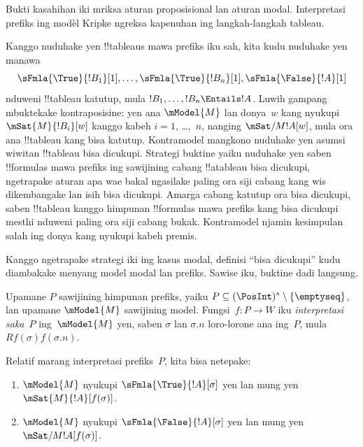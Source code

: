\documentclass[../../../include/open-logic-section]{subfiles}
\begin{document}


\begin{editorial}
Bukti kasahihan iki mriksa aturan proposisional lan aturan modal. Interpretasi prefiks ing modèl Kripke ngreksa kapenuhan ing langkah-langkah tableau.
\end{editorial}

\begin{explain}
  Kanggo nuduhake yen !!{tableau}s mawa prefiks iku sah, kita kudu
  nuduhake yen manawa
  \[
  \sFmla{\True}{!B_1}[1], \dots, \sFmla{\True}{!B_n}[1], \sFmla{\False}{!A}[1]
  \]
  nduweni !!{tableau} katutup, mula $!B_1, \dots, !B_n \Entails !A$.
  Luwih gampang mbuktekake kontraposisine: yen ana $\mModel{M}$ lan
  donya~$w$ kang nyukupi $\mSat{M}{!B_i}[w]$ kanggo kabeh $i=1$,
  \dots,~$n$, nanging $\mSat/{M}{!A}[w]$, mula ora ana !!{tableau}
  kang bisa katutup. Kontramodel mangkono nuduhake yen asumsi wiwitan
  !!{tableau} bisa dicukupi. Strategi buktine yaiku nuduhake yen saben
  !!{formula}s mawa prefiks ing sawijining cabang !!a{tableau} bisa
  dicukupi, ngetrapake aturan apa wae bakal ngasilake paling ora siji
  cabang kang wis dikembangake lan isih bisa dicukupi. Amarga cabang
  katutup ora bisa dicukupi, saben !!{tableau} kanggo himpunan
  !!{formula}s mawa prefiks kang bisa dicukupi mesthi nduweni paling
  ora siji cabang bukak. Kontramodel njamin kesimpulan salah ing donya kang nyukupi kabeh premis.

  Kanggo ngetrapake strategi iki ing kasus modal, definisi ``bisa
  dicukupi'' kudu diambakake menyang model modal lan prefiks. Sawise
  iku, buktine dadi langsung.
\end{explain}

\begin{defn}
  Upamane $P$ sawijining himpunan prefiks, yaiku $P \subseteq (\PosInt)^*
  \setminus \{\emptyseq\}$, lan upamane $\mModel{M}$ sawijining model.
  Fungsi~$f\colon P \to W$ iku \emph{interpretasi saka}~$P$
  ing~$\mModel{M}$ yen, saben $\sigma$ lan $\sigma.n$ loro-lorone
  ana ing~$P$, mula $Rf(\sigma)f(\sigma.n)$.

  Relatif marang interpretasi prefiks~$P$, kita bisa netepake:
  \begin{enumerate}
  \item $\mModel{M}$ nyukupi $\sFmla{\True}{!A}[\sigma]$ yen lan mung yen
    $\mSat{M}{!A}[f(\sigma)]$.
  \item $\mModel{M}$ nyukupi $\sFmla{\False}{!A}[\sigma]$ yen lan mung yen
    $\mSat/{M}{!A}[f(\sigma)]$.
  \end{enumerate}
\end{defn}
\end{document}
